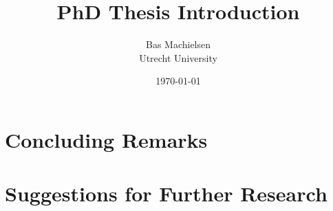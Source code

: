 

\title{\textbf{PhD Thesis Introduction}}
\author{Bas Machielsen \\ Utrecht University}
\date{\today}



\maketitle

\section{Concluding Remarks}


\section{Suggestions for Further Research}



